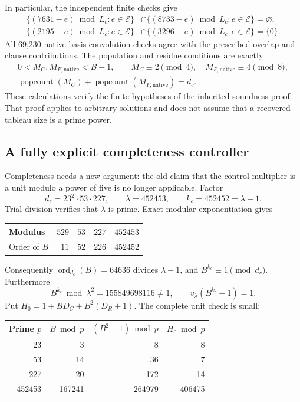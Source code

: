 In particular, the independent finite checks give
\begin{align*}
 \{(7631-e)\bmod L_c:e\in\mathcal E\}
 &\cap\{(8733-e)\bmod L_c:e\in\mathcal E\}=\varnothing,\\
 \{(2195-e)\bmod L_c:e\in\mathcal E\}
 &\cap\{(3296-e)\bmod L_c:e\in\mathcal E\}=\{0\}.
\end{align*}
All 69,230 native-basis convolution checks agree with the prescribed
overlap and clause contributions.  The population and residue conditions
are exactly
\begin{gather*}
0<M_C,M_{F,\mathrm{native}}<B-1,\qquad
M_C\equiv2\pmod4,\quad M_{F,\mathrm{native}}\equiv4\pmod8,\\
\operatorname{popcount}(M_C)+
\operatorname{popcount}(M_{F,\mathrm{native}})=d_c.
\end{gather*}
These calculations verify the finite hypotheses of the inherited
soundness proof.  That proof applies to arbitrary solutions and does not
assume that a recovered tableau size is a prime power.

\subsection{A fully explicit completeness controller}

Completeness needs a new argument: the old claim that the control
multiplier is a unit modulo a power of five is no longer applicable.
Factor
\[
 d_c=23^2\cdot53\cdot227,
 \qquad \lambda=452453,\qquad k_c=452452=\lambda-1.
\]
Trial division verifies that $\lambda$ is prime.  Exact modular
exponentiation gives
\begin{center}
\begin{tabular}{lrrrr}
\toprule
Modulus & $529$ & $53$ & $227$ & $452453$\\
\midrule
Order of $B$ & $11$ & $52$ & $226$ & $452452$\\
\bottomrule
\end{tabular}
\end{center}
Consequently $\operatorname{ord}_{d_c}(B)=64636$ divides $\lambda-1$,
and $B^{k_c}\equiv1\pmod{d_c}$.  Furthermore
\[
 B^{k_c}\bmod\lambda^2=155849698116\ne1,
 \qquad v_\lambda(B^{k_c}-1)=1.
\]
Put $H_0=1+BD_C+B^2(D_R+1)$.  The complete unit check is small:
\begin{center}
\begin{tabular}{rrrr}
\toprule
Prime $p$ & $B\bmod p$ & $(B^2-1)\bmod p$ & $H_0\bmod p$\\
\midrule
23 & 3 & 8 & 8\\
53 & 14 & 36 & 7\\
227 & 20 & 172 & 14\\
452453 & 167241 & 264979 & 406475\\
\bottomrule
\end{tabular}
\end{center}

